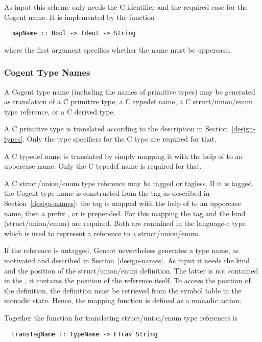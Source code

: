 As input this scheme only needs the C identifier and the required case for the Cogent name.
It is implemented by the function
\begin{verbatim}
  mapName :: Bool -> Ident -> String
\end{verbatim}
where the first argument specifies whether the name must be uppercase.

\subsubsection{Cogent Type Names}

A Cogent type name (including the names of primitive types) may be generated as translation of a C 
primitive type, a C typedef name, a C struct/union/enum type reference, or a C derived type. 

A C primitive type is translated according to the description in Section~\ref{design-types}. Only the
type specifiers for the C type are required for that.

A C typedef name is translated by simply mapping it with the help of  to an uppercase name.
Only the C typedef name is required for that.

A C struct/union/enum type reference may be tagged or tagless. If it is tagged, the Cogent type name is
constructed from the tag as described in Section~\ref{design-names}: the tag is mapped with the help of
 to an uppercase name, then a prefix ,  or  is 
prepended. For this mapping the tag and the kind (struct/union/enum) are required. Both are contained
in the language-c type  which is used to represent a reference to a struct/union/enum.

If the reference is untagged, Gencot nevertheless generates a type name, as motivated and described 
in Section~\ref{design-names}. As input it needs the kind and the position of the struct/union/enum 
definition. The latter is not contained in the , it contains the position of the reference
itself. To access the position of the definition, the definition must be retrieved from the symbol table
in the monadic state. Hence, the mapping function is defined as a monadic action.

Together the function for translating struct/union/enum type references is
\begin{verbatim}
  transTagName :: TypeName -> FTrav String
\end{verbatim}

